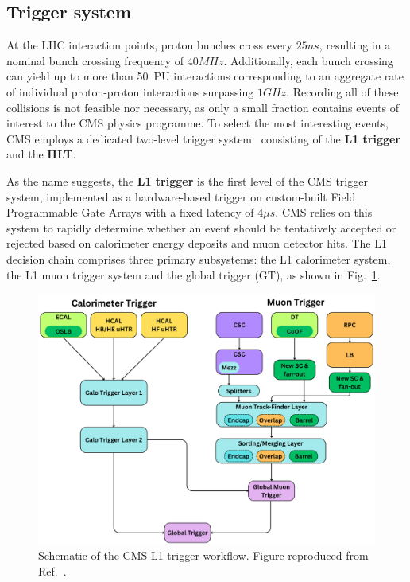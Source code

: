\subsection{Trigger system}

At the LHC interaction points, proton bunches cross every $25\unit{ns}$, resulting in a nominal bunch crossing frequency of $40\unit{MHz}$. Additionally, each bunch crossing can yield up to more than 50~PU interactions corresponding to an aggregate rate of individual proton-proton interactions surpassing $1\unit{GHz}$. Recording all of these collisions is not feasible nor necessary, as only a small fraction contains events of interest to the CMS physics programme. To select the most interesting events, CMS employs a dedicated two-level trigger system~\cite{CMS_Trigger} consisting of the \textbf{\ac{L1} trigger} and the \textbf{\ac{HLT}}.

As the name suggests, the \textbf{L1 trigger} is the first level of the CMS trigger system, implemented as a hardware-based trigger on custom-built Field Programmable Gate Arrays with a fixed latency of $4\unit{\mu s}$. CMS relies on this system to rapidly determine whether an event should be tentatively accepted or rejected based on calorimeter energy deposits and muon detector hits. The L1 decision chain comprises three primary subsystems: the L1 calorimeter system, the L1 muon trigger system and the global trigger (GT), as shown in Fig.~\ref{Figure:Chapter3_CMS_L1_Trigger}.

\begin{figure}[h]
\centering
\includegraphics[width= 1.0\textwidth]{Figures/Chapter3/CMS_L1_Trigger.pdf}
\caption[Schematic of the CMS L1 trigger workflow]{Schematic of the CMS L1 trigger workflow. Figure reproduced from Ref.~\cite{CMS_L1_Trigger}.}
\label{Figure:Chapter3_CMS_L1_Trigger}
\end{figure}

